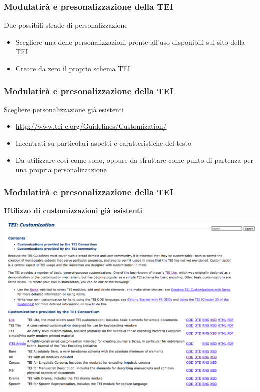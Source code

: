    \begin{frame}
        \frametitle{Modulatirà e presonalizzazione della TEI}
        \addtocounter{nframe}{1}

        \begin{block}{Due possibili strade di personalizzazione}
                \begin{itemize}
                    \item Scegliere una delle personalizzazioni pronte all’uso disponibili sul sito della TEI
                    \item Creare da zero il proprio schema TEI
                \end{itemize} 
        \end{block}
        
    \end{frame}


    \begin{frame}
        \frametitle{Modulatirà e presonalizzazione della TEI}
        \addtocounter{nframe}{1}

        \begin{block}{Scegliere personalizzazione già esistenti}
                \begin{itemize}
                    \item \url{http://www.tei-c.org/Guidelines/Customization/}
                    \item Incentrati su particolari aspetti e caratteristiche del testo
                    \item Da utilizzare così come sono, oppure da sfruttare come punto di
                    partenza per una propria personalizzazione
                \end{itemize} 
        \end{block}
        
    \end{frame}

    \begin{frame}
        \frametitle{Modulatirà e presonalizzazione della TEI}
        \addtocounter{nframe}{1}
        
        \textbf{Utilizzo di customizzazioni già esistenti}

         \begin{center}
            \includegraphics[width=.9\textwidth]{imgs/customization.png}
         \end{center}
       
        
    \end{frame}


